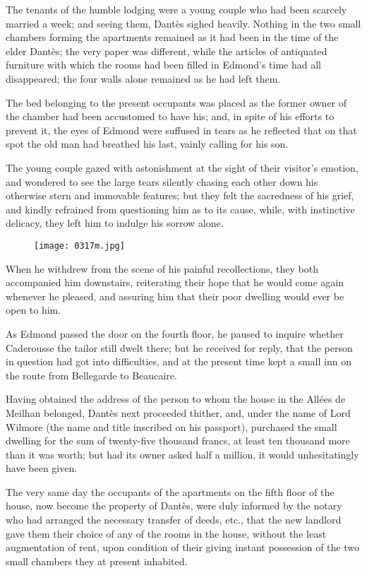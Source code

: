 The tenants of the humble lodging were a young couple who had been
scarcely married a week; and seeing them, Dantès sighed heavily.
Nothing in the two small chambers forming the apartments remained as it
had been in the time of the elder Dantès; the very paper was different,
while the articles of antiquated furniture with which the rooms had
been filled in Edmond’s time had all disappeared; the four walls alone
remained as he had left them.

The bed belonging to the present occupants was placed as the former
owner of the chamber had been accustomed to have his; and, in spite of
his efforts to prevent it, the eyes of Edmond were suffused in tears as
he reflected that on that spot the old man had breathed his last,
vainly calling for his son.

The young couple gazed with astonishment at the sight of their
visitor’s emotion, and wondered to see the large tears silently chasing
each other down his otherwise stern and immovable features; but they
felt the sacredness of his grief, and kindly refrained from questioning
him as to its cause, while, with instinctive delicacy, they left him to
indulge his sorrow alone.

\begin{figure}[h]
\texttt{[image: 0317m.jpg]}
\end{figure}

When he withdrew from the scene of his painful recollections, they both
accompanied him downstairs, reiterating their hope that he would come
again whenever he pleased, and assuring him that their poor dwelling
would ever be open to him.

As Edmond passed the door on the fourth floor, he paused to inquire
whether Caderousse the tailor still dwelt there; but he received for
reply, that the person in question had got into difficulties, and at
the present time kept a small inn on the route from Bellegarde to
Beaucaire.

Having obtained the address of the person to whom the house in the
Allées de Meilhan belonged, Dantès next proceeded thither, and, under
the name of Lord Wilmore (the name and title inscribed on his
passport), purchased the small dwelling for the sum of twenty-five
thousand francs, at least ten thousand more than it was worth; but had
its owner asked half a million, it would unhesitatingly have been
given.

The very same day the occupants of the apartments on the fifth floor of
the house, now become the property of Dantès, were duly informed by the
notary who had arranged the necessary transfer of deeds, etc., that the
new landlord gave them their choice of any of the rooms in the house,
without the least augmentation of rent, upon condition of their giving
instant possession of the two small chambers they at present inhabited.

